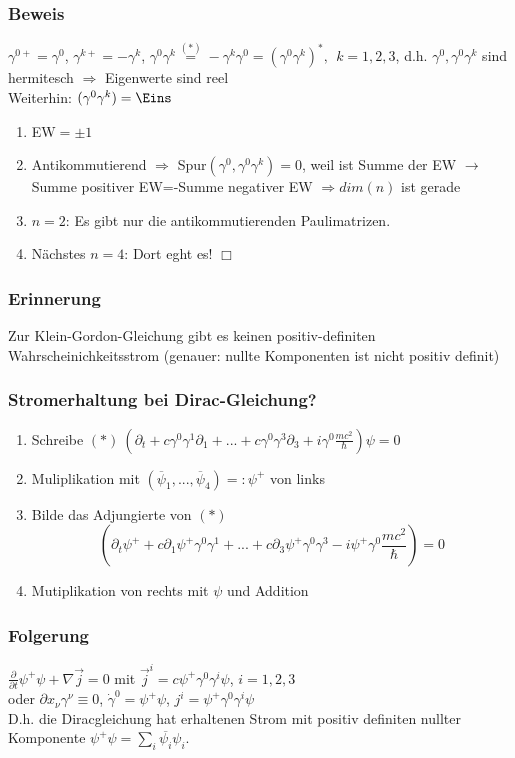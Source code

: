 \documentclass[twoside,a4paper]{scrartcl}
\renewcommand{\1}{\mathds{1}}
\newcommand{\Ra}{\Rightarrow}
\newcommand{\ra}{\rightarrow}
\begin{document}
\subsubsection*{Beweis}
$\gamma^{0+}=\gamma^0$, $\gamma^{k+}=-\gamma^k$, $\gamma^0\gamma^k\stackrel{(*)}{=}-\gamma^k\gamma^0=(\gamma^0\gamma^k)^*, \ \ k=1,2,3$, d.h. $\gamma^0, \gamma^0\gamma^k$ sind hermitesch $\Ra$ Eigenwerte sind reel\\
Weiterhin: $(\gamma^0\gamma^k)=\Eins$
\begin{enumerate}
\item EW$=\pm 1$
\item Antikommutierend $\Ra$ Spur$(\gamma^0,\gamma^0\gamma^k)=0$, weil ist Summe der EW $\ra$ Summe positiver EW=-Summe negativer EW $\Ra dim(n)$ ist gerade
\item \underline{$n=2$}: Es gibt nur die antikommutierenden Paulimatrizen.
\item Nächstes \underline{$n=4$}: Dort eght es! $\Box$
\end{enumerate}
\subsubsection*{Erinnerung}
Zur Klein-Gordon-Gleichung gibt es keinen positiv-definiten Wahrscheinichkeitsstrom (genauer: nullte Komponenten ist nicht positiv definit)
\subsubsection*{Stromerhaltung bei Dirac-Gleichung?}
\begin{enumerate}
\item Schreibe $(*) \ (\partial_t+c\gamma^0\gamma^1 \partial_1+...+c\gamma^0\gamma^3 \partial_3+i\gamma^0\frac{mc^2}{\hbar})\psi=0$
\item Muliplikation mit $(\overline{\psi}_1,...,\overline{\psi}_4)=:\psi^+$ von links
\item Bilde das Adjungierte von $(*)$ 
$$(\partial_t \psi^++c\partial_1\psi^+\gamma^0\gamma^1 +...+c\partial_3\psi^+\gamma^0\gamma^3 -i\psi^+\gamma^0\frac{mc^2}{\hbar})=0$$
\item Mutiplikation von rechts mit $\psi$ und Addition
\end{enumerate}
\subsubsection*{Folgerung}
$\frac{\partial}{\partial t} \psi^+\psi+\nabla \vec j=0$ mit $\vec j^i=c \psi^+\gamma^0\gamma^i\psi$, $i=1,2,3$ \\
oder $\partial x_\nu \gamma^\nu\equiv 0$, $\dot \gamma^0=\psi^+\psi$, $j^i=\psi^+\gamma^0\gamma^i\psi$\\
D.h. die Diracgleichung hat erhaltenen Strom mit positiv definiten nullter Komponente $\psi^+\psi=\sum_i \overline{\psi_i}\psi_i$.\\
% 
\end{document}
